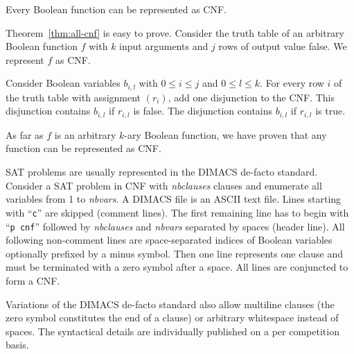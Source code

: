 \begin{theorem}
  \label{thm:all-cnf}
  Every Boolean function can be represented as CNF.
\end{theorem}

Theorem~\ref{thm:all-cnf} is easy to prove.
%
Consider the truth table of an arbitrary Boolean function $f$ with $k$ input arguments
and $j$ rows of output value false. We represent $f$ as CNF.

Consider Boolean variables $b_{i,l}$ with $0 \leq i \leq j$ and $0 \leq l \leq k$.
For every row $i$ of the truth table with assignment $(r_i)$, add one disjunction to the CNF.
This disjunction contains $b_{i,l}$ if $r_{i,l}$ is false.
The disjunction contains $b_{i,l}$ if $r_{i,l}$ is true.

As far as $f$ is an arbitrary $k$-ary Boolean function, we have proven that
any function can be represented as CNF.

SAT problems are usually represented in the DIMACS de-facto standard.
Consider a SAT problem in CNF with \emph{nbclauses} clauses and
enumerate all variables from 1 to \emph{nbvars}. A DIMACS file is an ASCII text
file. Lines starting with \enquote{\texttt{c}} are skipped (comment lines).
The first remaining line has to begin with \enquote{\texttt{p cnf}} followed by
\emph{nbclauses} and \emph{nbvars} separated by spaces (header line).
All following non-comment lines are space-separated indices of Boolean variables
optionally prefixed by a minus symbol. Then one line represents one clause and
must be terminated with a zero symbol after a space. All lines are conjuncted
to form a CNF.

Variations of the DIMACS de-facto standard also allow multiline clauses (the
zero symbol constitutes the end of a clause) or arbitrary whitespace instead of
spaces. The syntactical details are individually published on a per competition
basis.

